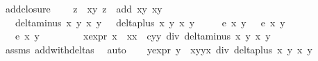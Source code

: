 \begin{isabellebody}
%
\endisadelimproof
\isanewline
{}\isamarkupfalse%
\ add{\isacharunderscore}closure{\isacharcolon}\ \isanewline
\ \ \ {\isachardoublequoteopen}z{}\ {\isacharequal}\ {\isacharparenleft}x{}{\isacharcomma}y{}{\isacharparenright}{\isachardoublequoteclose}\ {\isachardoublequoteopen}z{}\ {\isacharequal}\ add\ {\isacharparenleft}x{}{\isacharcomma}y{}{\isacharparenright}\ {\isacharparenleft}x{}{\isacharcomma}y{}{\isacharparenright}{\isachardoublequoteclose}\isanewline
\ \ \ {\isachardoublequoteopen}delta{\isacharunderscore}minus\ x{}\ y{}\ x{}\ y{}\ {\isasymnoteq}\ {}{\isachardoublequoteclose}\ {\isachardoublequoteopen}delta{\isacharunderscore}plus\ x{}\ y{}\ x{}\ y{}\ {\isasymnoteq}\ {}{\isachardoublequoteclose}\isanewline
\ \ \ {\isachardoublequoteopen}e\ x{}\ y{}\ {\isacharequal}\ {}{\isachardoublequoteclose}\ {\isachardoublequoteopen}e\ x{}\ y{}\ {\isacharequal}\ {}{\isachardoublequoteclose}\ \isanewline
\ \ \ {\isachardoublequoteopen}e\ x{}\ y{}\ {\isacharequal}\ {}{\isachardoublequoteclose}\ \isanewline
%
\isadelimproof
%
\endisadelimproof
%
\isatagproof
{}\isamarkupfalse%
\ {\isacharminus}\isanewline
\ \ \isamarkupfalse%
\ x{}{\isacharunderscore}expr{\isacharcolon}\ {\isachardoublequoteopen}x{}\ {\isacharequal}\ {\isacharparenleft}x{}{\isacharasterisk}x{}\ {\isacharminus}\ c{\isacharasterisk}y{}{\isacharasterisk}y{}{\isacharparenright}\ div\ {\isacharparenleft}delta{\isacharunderscore}minus\ x{}\ y{}\ x{}\ y{}{\isacharparenright}{\isachardoublequoteclose}\isanewline
\ \ \ \ \isamarkupfalse%
\ assms\ add{\isacharunderscore}with{\isacharunderscore}deltas\ \isamarkupfalse%
\ auto\isanewline
\ \ \isamarkupfalse%
\ y{}{\isacharunderscore}expr{\isacharcolon}\ {\isachardoublequoteopen}y{}\ {\isacharequal}\ {\isacharparenleft}x{}{\isacharasterisk}y{}{\isacharplus}y{}{\isacharasterisk}x{}{\isacharparenright}\ div\ {\isacharparenleft}delta{\isacharunderscore}plus\ x{}\ y{}\ x{}\ y{}{\isacharparenright}{\isachardoublequoteclose}\isanewline

\end{isabellebody}
